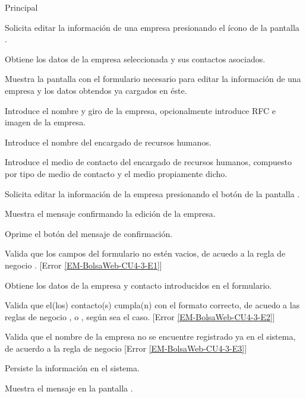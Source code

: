 \begin{UCtrayectoria}{Principal}

	\UCpaso [\UCactor] Solicita editar la información de una empresa presionando el ícono  de la pantalla .

	\UCpaso	Obtiene los datos de la empresa seleccionada y sus contactos asociados. 

	\UCpaso Muestra la pantalla  con el formulario necesario para editar la información de una empresa y los datos obtendos ya cargados en éste. \label{EM-BolsaWeb-CU4-3-DatosObligatorios}

	\UCpaso [\UCactor] Introduce el nombre y giro de la empresa, opcionalmente introduce RFC e imagen de la empresa. 

	\UCpaso [\UCactor] Introduce el nombre del encargado de recursos humanos.

	\UCpaso [\UCactor] Introduce el medio de contacto del encargado de recursos humanos, compuesto por tipo de medio de contacto y el medio propiamente dicho. \label{EM-BolsaWeb-CU4-3-AgregarContacto}

	\UCpaso [\UCactor] Solicita editar la información de la empresa presionando el botón  de la pantalla .   

	\UCpaso Muestra el mensaje  confirmando la edición de la empresa. 

	\UCpaso [\UCactor] Oprime el botón  del mensaje de confirmación.  

	\UCpaso Valida que los campos del formulario no estén vacios, de acuedo a la regla de negocio . [Error \ref{EM-BolsaWeb-CU4-3-E1}] 

	\UCpaso Obtiene los datos de la empresa y contacto introducidos en el formulario. 

	\UCpaso Valida que el(los) contacto(s) cumpla(n) con el formato correcto, de acuedo a las reglas de negocio ,  o , según sea el caso. [Error \ref{EM-BolsaWeb-CU4-3-E2}] 

	\UCpaso Valida que el nombre de la empresa no se encuentre registrado ya en el sistema, de acuerdo a la regla de negocio  [Error \ref{EM-BolsaWeb-CU4-3-E3}] 
	
	\UCpaso Persiste la información en el sistema.

	\UCpaso Muestra el mensaje  en la pantalla . 
\end{UCtrayectoria}

